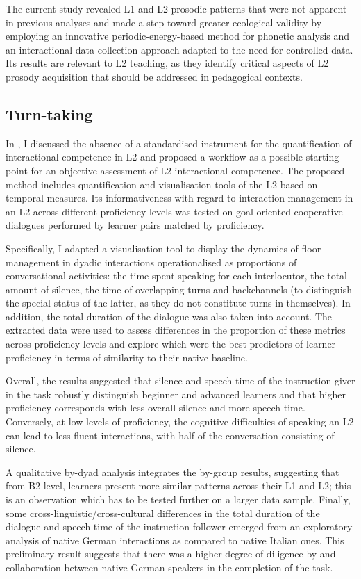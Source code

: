 The current study revealed L1 and L2 prosodic patterns that were not apparent in previous analyses and made a step toward greater ecological validity by employing an innovative periodic-energy-based method for phonetic analysis and an interactional data collection approach adapted to the need for controlled data. Its results are relevant to L2 teaching, as they identify critical aspects of L2 prosody acquisition that should be addressed in pedagogical contexts.

\subsection{Turn-taking}
In , I discussed the absence of a standardised instrument for the quantification of interactional competence in L2 and proposed a workflow as a possible starting point for an objective assessment of L2 interactional competence. The proposed method includes quantification and visualisation tools of the L2 based on temporal measures. Its informativeness with regard to interaction management in an L2 across different proficiency levels was tested on goal-oriented cooperative dialogues performed by learner pairs matched by proficiency.

Specifically, I adapted a visualisation tool to display the dynamics of floor management in dyadic interactions operationalised as proportions of conversational activities: the time spent speaking for each interlocutor, the total amount of silence, the time of overlapping turns and backchannels (to distinguish the special status of the latter, as they do not constitute turns in themselves). In addition, the total duration of the dialogue was also taken into account. The extracted data were used to assess differences in the proportion of these metrics across proficiency levels and explore which were the best predictors of learner proficiency in terms of similarity to their native baseline.

Overall, the results suggested that silence and speech time of the instruction giver in the task robustly distinguish beginner and advanced learners and that higher proficiency corresponds with less overall silence and more speech time. Conversely, at low levels of proficiency, the cognitive difficulties of speaking an L2 can lead to less fluent interactions, with half of the conversation consisting of silence.

A qualitative by-dyad analysis integrates the by-group results, suggesting that from B2 level, learners present more similar patterns across their L1 and L2; this is an observation which has to be tested further on a larger data sample. Finally, some cross-linguistic/cross-cultural differences in the total duration of the dialogue and speech time of the instruction follower emerged from an exploratory analysis of native German interactions as compared to native Italian ones. This preliminary result suggests that there was a higher degree of diligence by and collaboration between native German speakers in the completion of the task.

